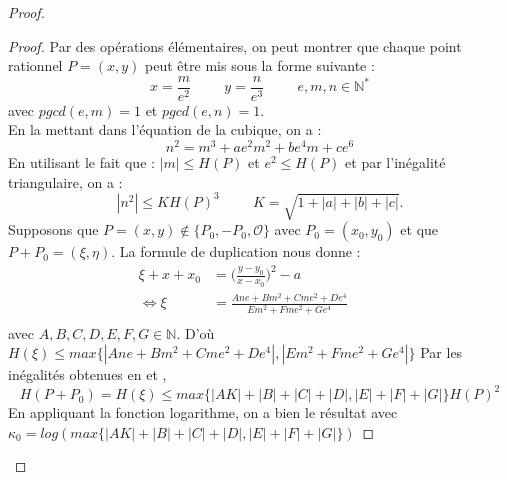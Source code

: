 \documentclass[a4paper]{article}
\begin{document}
\begin{proof}
\begin{proof}
Par des opérations élémentaires, on peut montrer que chaque point rationnel $P=(x,y)$ peut être mis sous la forme suivante :
\begin{equation} \label{neutr}
x=\frac{m}{e^2} \hspace{1cm} y=\frac{n}{e^3} \hspace{1cm} e,m,n \in \mathbb{N^*} 
\end{equation}
avec $pgcd(e,m)=1$ et $pgcd(e,n)=1$. \\
En la mettant dans l'équation de la cubique, on a :
\begin{equation*}
n^2=m^3+ae^2m^2+be^4m+ce^6
\end{equation*}
En utilisant le fait que :
$\mid m \mid \leqslant H(P)$ et $e^2 \leqslant H(P)$
et par l'inégalité triangulaire, on a :
\begin{equation}
| n^2 | \leqslant K H(P)^3   \hspace{1cm} K=\sqrt{1+|a|+|b|+|c|}.
\end{equation}
Supposons que $P=(x,y) \notin \{P_{0},-P_{0},\mathcal{O} \}$ avec $ P_{0}=(x_{0},y_{0})$ et que $P+P_{0}=(\xi,\eta)$.
La formule de duplication nous donne :
\begin{align*}
\xi+x+x_{0}&=\Big(\frac{y-y_{0}}{x-x_{0}}\Big)^2-a \\
\iff \xi&= \frac{Ane+Bm^2+Cme^2+De^4}{Em^2+Fme^2+Ge^4} \hspace{1cm}       \\ 
\end{align*}
avec $A,B,C,D,E,F,G \in \mathbb{N}$.  
D'où $H(\xi) \leqslant max\{| Ane+Bm^2+Cme^2+De^4 |, | Em^2+Fme^2+Ge^4 | \}$
Par les inégalités obtenues en  et , 
\begin{equation*}
H(P+P_{0})=H(\xi)\leqslant max \{| AK | + | B | + | C |+| D |, | E | + | F | + | G |\}H(P)^2
\end{equation*}
En appliquant la fonction logarithme, on a bien le résultat avec
$
\kappa_{0}=log(max \{| AK | + | B | + | C |+| D |, | E | + | F | + | G |\})$
\end{proof}


\end{proof}
\end{document}
